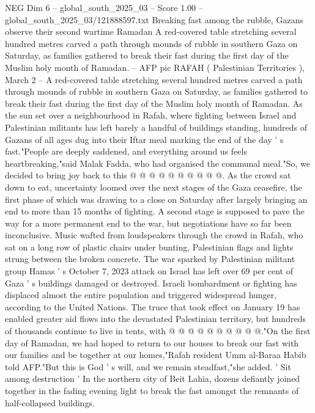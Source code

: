 \begin{textsample}{NEG Dim 6 – global\_south\_2025\_03 – Score 1.00 – global\_south\_2025\_03/121888597.txt}  \label{ex:f6_neg_145}
Breaking fast among the rubble, Gazans observe their second wartime Ramadan A red-covered table stretching several hundred metres carved a path through mounds of rubble in southern Gaza on Saturday, as families gathered to break their fast during the first day of the Muslim holy month of Ramadan. -- AFP pic RAFAH ( Palestinian Territories ), March 2 -- A red-covered table stretching several hundred metres carved a path through mounds of rubble in southern Gaza on Saturday, as families gathered to break their fast during the first day of the Muslim holy month of Ramadan.
As the sun set over a neighbourhood in Rafah, where fighting between Israel and Palestinian militants has left barely a handful of buildings standing, hundreds of Gazans of all ages dug into their Iftar meal marking the end of the day ' s fast."People are deeply saddened, and everything around us feels heartbreaking,"said Malak Fadda, who had organised the communal meal."So, we decided to bring joy back to this @ @ @ @ @ @ @ @ @ @.
As the crowd sat down to eat, uncertainty loomed over the next stages of the Gaza ceasefire, the first phase of which was drawing to a close on Saturday after largely bringing an end to more than 15 months of fighting.
A second stage is supposed to pave the way for a more permanent end to the war, but negotiations have so far been inconclusive.
Music wafted from loudspeakers through the crowd in Rafah, who sat on a long row of plastic chairs under bunting, Palestinian flags and lights strung between the broken concrete.
The war sparked by Palestinian militant group Hamas ' s October 7, 2023 attack on Israel has left over 69 per cent of Gaza ' s buildings damaged or destroyed.
Israeli bombardment or fighting has displaced almost the entire population and triggered widespread hunger, according to the United Nations.
The truce that took effect on January 19 has enabled greater aid flows into the devastated Palestinian territory, but hundreds of thousands continue to live in tents, with @ @ @ @ @ @ @ @ @ @."On the first day of Ramadan, we had hoped to return to our houses to break our fast with our families and be together at our homes,"Rafah resident Umm al-Baraa Habib told AFP."But this is God ' s will, and we remain steadfast,"she added. ' Sit among destruction ' In the northern city of Beit Lahia, dozens defiantly joined together in the fading evening light to break the fast amongst the remnants of half-collapsed buildings.

\end{textsample}
